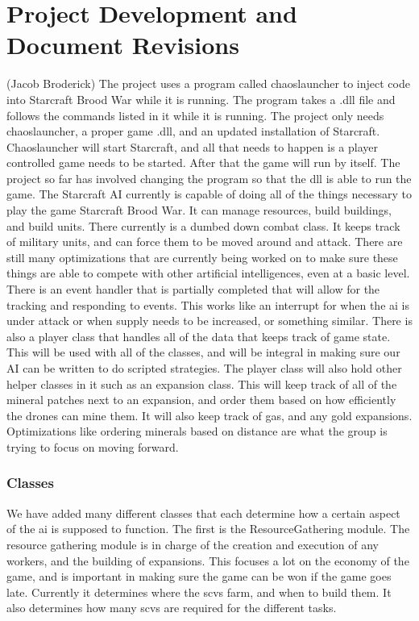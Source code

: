 \documentclass[10pt,letterpaper,onecolumn,draftclsnofoot]{IEEEtran}
\begin{document}
	\section{Project Development and Document Revisions} (Jacob Broderick)
	The project uses a program called chaoslauncher to inject code into Starcraft Brood War while it is running. The program takes a .dll file and follows the commands listed in it while it is running. The project only needs chaoslauncher, a proper game .dll, and an updated installation of Starcraft. Chaoslauncher will start Starcraft, and all that needs to happen is a player controlled game needs to be started. After that the game will run by itself. The project so far has involved changing the program so that the dll is able to run the game. The Starcraft AI currently is capable of doing all of the things necessary to play the game Starcraft Brood War. It can manage resources, build buildings, and build units. There currently is a dumbed down combat class. It keeps track of military units, and can force them to be moved around and attack. There are still many optimizations that are currently being worked on to make sure these things are able to compete with other artificial intelligences, even at a basic level. There is an event handler that is partially completed that will allow for the tracking and responding to events. This works like an interrupt for when the ai is under attack or when supply needs to be increased, or something similar. There is also a player class that handles all of the data that keeps track of game state. This will be used with all of the classes, and will be integral in making sure our AI can be written to do scripted strategies. The player class will also hold other helper classes in it such as an expansion class. This will keep track of all of the mineral patches next to an expansion, and order them based on how efficiently the drones can mine them. It will also keep track of gas, and any gold expansions. Optimizations like ordering minerals based on distance are what the group is trying to focus on moving forward. 
	
	\subsubsection{Classes}
	We have added many different classes that each determine how a certain aspect of the ai is supposed to function. The first is the ResourceGathering module. The resource gathering module is in charge of the creation and execution of any workers, and the building of expansions. This focuses a lot on the economy of the game, and is important in making sure the game can be won if the game goes late. Currently it determines where the scvs farm, and when to build them. It also determines how many scvs are required for the different tasks.  
	
\end{document}
